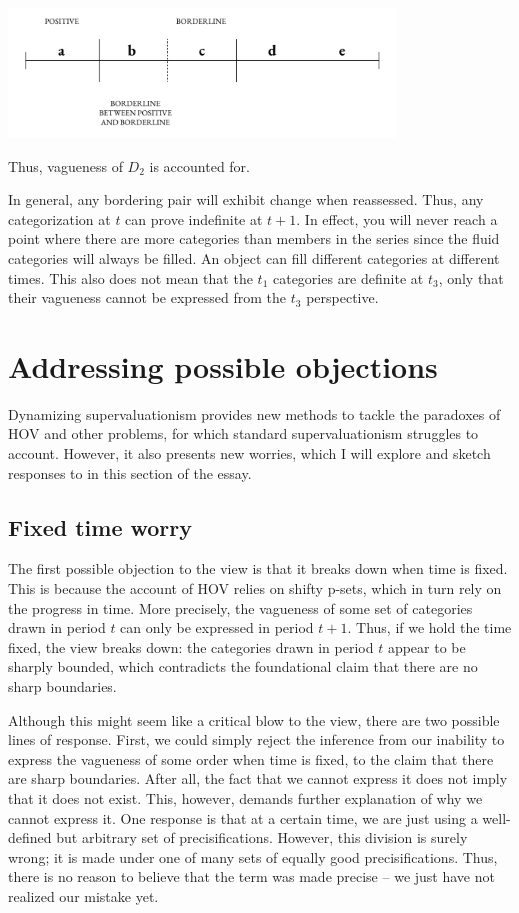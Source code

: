 \begin{center}
    \includegraphics[width=0.77\textwidth]{papers/figures/2-6.pdf}
  \end{center}
Thus, vagueness of \(D_{2}\) is accounted for.

In general, any bordering pair will exhibit change when reassessed.
Thus, any categorization at $t$ can prove indefinite at $t+1$.
In effect, you will never reach a point where there are more categories
than members in the series since the fluid categories will always be
filled. An object can fill different categories at different times. This
also does not mean that the \(t_{1}\) categories are definite at
\(t_{3}\), only that their vagueness cannot be expressed from the
\(t_{3}\) perspective.

\section{Addressing possible objections}

Dynamizing supervaluationism provides new methods to tackle the
paradoxes of HOV and other problems, for which standard
supervaluationism struggles to account. However, it also presents new
worries, which I will explore and sketch responses to in this section of
the essay.

\subsection{Fixed time worry}

The first possible objection to the view is that it breaks down when
time is fixed. This is because the account of HOV relies on shifty
p-sets, which in turn rely on the progress in time. More precisely, the
vagueness of some set of categories drawn in period $t$ can only be
expressed in period $t+1$. Thus, if we hold the time fixed, the
view breaks down: the categories drawn in period $t$ appear to be
sharply bounded, which contradicts the foundational claim that there are
no sharp boundaries.

Although this might seem like a critical blow to the view, there are two
possible lines of response. First, we could simply reject the inference
from our inability to express the vagueness of some order when time is
fixed, to the claim that there are sharp boundaries. After all, the fact
that we cannot express it does not imply that it does not exist. This,
however, demands further explanation of why we cannot express it. One
response is that at a certain time, we are just using a well-defined but
arbitrary set of precisifications. However, this division is surely
wrong; it is made under one of many sets of equally good
precisifications. Thus, there is no reason to believe that the term was
made precise -- we just have not realized our mistake yet.


